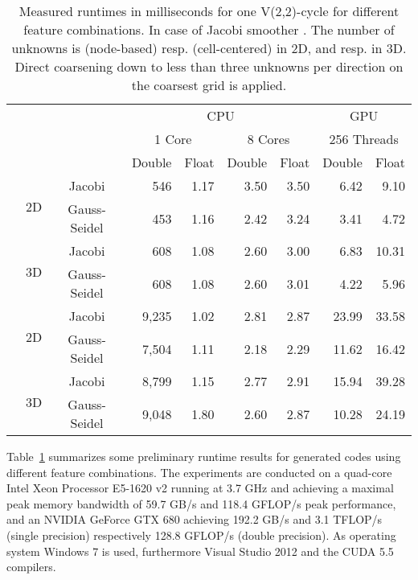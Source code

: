 \documentclass[onecolumn]{svjour3}
\newcommand{\examultirow}[2]{\multirow{#1}{*}{\rotatebox[origin=c]{90}{\centering #2}}}
\begin{document}
\begin{table}
\begin{center}

\begin{tabular}{ccc rrrrrr}
    \toprule
&&& \multicolumn{4}{c}{CPU} & \multicolumn{2}{c}{GPU}\\
\cmidrule{4-9}
&&& \multicolumn{2}{c}{1 Core} & \multicolumn{2}{c}{8 Cores} & \multicolumn{2}{c}{256 Threads}\\
\cmidrule{4-9}
&&& Double & Float & Double & Float & Double & Float\\
\midrule
\examultirow{5}{Laplacian} & \multirow{2}{*}{2D} &  Jacobi &         546   & 1.17 & 3.50 & 3.50 & 6.42  & 9.10\\
\cmidrule{3-9}
& &                                             Gauss-Seidel &       453   & 1.16 & 2.42 & 3.24 & 3.41  & 4.72\\
\cmidrule{2-9}
& \multirow{2}{*}{3D} &                             Jacobi &         608   & 1.08 & 2.60 & 3.00 & 6.83  & 10.31\\
\cmidrule{3-9}
& &                                         Gauss-Seidel &           608   & 1.08 & 2.60 & 3.01 & 4.22  & 5.96\\
\midrule
\examultirow{5}{Complex Diff.} & \multirow{2}{*}{2D} & Jacobi &      9,235 & 1.02 & 2.81 & 2.87 & 23.99 & 33.58\\
\cmidrule{3-9}
&&                                          Gauss-Seidel &           7,504 & 1.11 & 2.18 & 2.29 & 11.62 & 16.42\\
\cmidrule{2-9}
& \multirow{2}{*}{3D} &                         Jacobi &             8,799 & 1.15 & 2.77 & 2.91 & 15.94 & 39.28\\
\cmidrule{3-9}
&&                                          Gauss-Seidel &           9,048 & 1.80 & 2.60 & 2.87 & 10.28 & 24.19\\
\bottomrule
\end{tabular}

\caption[Partitioning of a cell-centered grid into four sub-grids]{\label{tab:generatorresults}Measured runtimes in milliseconds for one V(2,2)-cycle for different feature combinations. In case of Jacobi smoother . The number of unknowns is  (node-based) resp.  (cell-centered) in 2D, and  resp.  in 3D. Direct coarsening down to less than three unknowns per direction on the coarsest grid is applied.}
\end{center}
\end{table}
 
Table~\ref{tab:generatorresults} summarizes some preliminary runtime results for generated codes using different feature combinations.
The experiments are conducted on a quad-core Intel Xeon Processor E5-1620 v2 running at 3.7 GHz and achieving a maximal peak memory bandwidth of 59.7 GB/s and 118.4 GFLOP/s peak performance, and an NVIDIA GeForce GTX 680 achieving 192.2 GB/s and 3.1 TFLOP/s (single precision) respectively 128.8 GFLOP/s (double precision). 
As operating system Windows 7 is used, furthermore Visual Studio 2012 and the CUDA 5.5 compilers.
\end{document}
